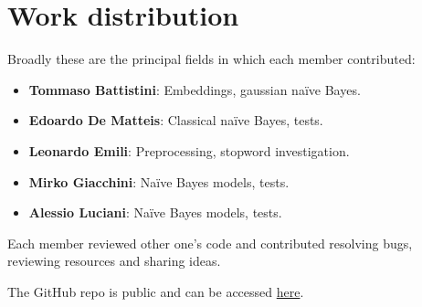 \section*{Work distribution}
Broadly these are the principal fields in which each member contributed:

\begin{itemize}
    \item \textbf{Tommaso Battistini}: Embeddings, gaussian na\"ive Bayes.
    \item \textbf{Edoardo De Matteis}: Classical na\"ive Bayes, tests.
    \item \textbf{Leonardo Emili}: Preprocessing, stopword investigation.
    \item \textbf{Mirko Giacchini}: Na\"ive Bayes models, tests.
    \item \textbf{Alessio Luciani}: Na\"ive Bayes models, tests.
\end{itemize}

Each member reviewed other one's code and contributed resolving bugs, reviewing resources and sharing ideas. 

The GitHub repo is public and can be accessed \href{https://github.com/Frisayl/Plaint-or-tweet}{here}.
